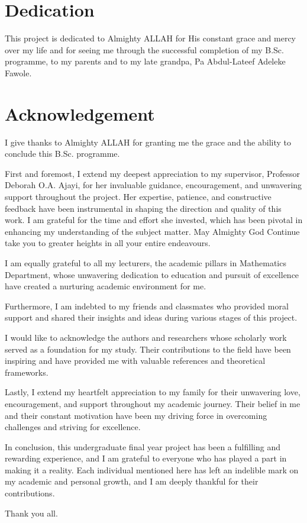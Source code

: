 \documentclass[
    a4paper,%
    12pt,%
    oneside, %
    openany, %
]{report}
\begin{document}
\chapter*{Dedication}
This project is dedicated to Almighty ALLAH for His constant grace and mercy over my life and for seeing me through the successful completion of my B.Sc. programme, to my parents and to my late grandpa, Pa Abdul-Lateef Adeleke Fawole.


\chapter*{Acknowledgement}
I give thanks to Almighty ALLAH for granting me the grace and the ability to conclude this B.Sc. programme.

First and foremost, I extend my deepest appreciation to my supervisor, Professor Deborah O.A. Ajayi, for her invaluable guidance, encouragement, and unwavering support throughout the project. Her expertise, patience, and constructive feedback have been instrumental in shaping the direction and quality of this work. I am grateful for the time and effort she invested, which has been pivotal in enhancing my understanding of the subject matter. May Almighty God Continue take you to greater heights in all your entire endeavours. 

I am equally grateful to all my lecturers, the academic pillars in Mathematics Department, whose unwavering dedication to education and pursuit of excellence have created a nurturing academic environment for me.

Furthermore, I am indebted to my friends and classmates who provided moral support and shared their insights and ideas during various stages of this project.

I would like to acknowledge the authors and researchers whose scholarly work served as a foundation for my study. Their contributions to the field have been inspiring and have provided me with valuable references and theoretical frameworks.

Lastly, I extend my heartfelt appreciation to my family for their unwavering love, encouragement, and support throughout my academic journey. Their belief in me and their constant motivation have been my driving force in overcoming challenges and striving for excellence.

In conclusion, this undergraduate final year project has been a fulfilling and rewarding experience, and I am grateful to everyone who has played a part in making it a reality. Each individual mentioned here has left an indelible mark on my academic and personal growth, and I am deeply thankful for their contributions.

Thank you all.



\newpage



{}
\tableofcontents
\listoffigures
\newpage
{}







\end{document}
